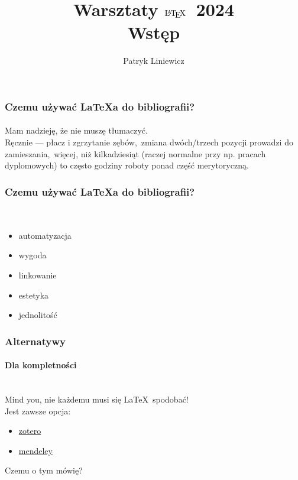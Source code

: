 \documentclass[14pt,compress,usenames,dvipsnames,aspectratio=169]{beamer}
\title{Warsztaty $\textrm{\LaTeX}$\ 2024 \\ {\normalsize Wstęp}}
\author{Patryk Liniewicz}
\institute[]{%
{\Large $\mel{N}{\hat{K}}{F}$}
}
\date{}
\begin{document}

\begin{frame}[plain]
\titlepage
\end{frame}

\begin{frame}[c]
	\frametitle{Czemu używać {\LaTeX}a do bibliografii?}
	\framesubtitle{}
	Mam nadzieję, że nie muszę tłumaczyć.\pause\\

	Ręcznie --- płacz i zgrzytanie zębów,\pause~zmiana dwóch/trzech pozycji prowadzi do zamieszania,\pause~więcej, niż kilkadziesiąt (raczej normalne przy np. pracach dyplomowych) to często godziny roboty ponad część merytoryczną.

\end{frame}

\begin{frame}[fragile,c]
	\frametitle{Czemu używać {\LaTeX}a do bibliografii?}
	\framesubtitle{}\pause\\
	\begin{itemize}
		\item automatyzacja\pause\\
		\item wygoda\pause\\
		\item linkowanie\pause\\
		\item estetyka\pause\\
		\item jednolitość
	\end{itemize}
\end{frame}

\begin{frame}[c]
	\frametitle{Alternatywy}
	\framesubtitle{Dla kompletności}\pause\\

	Mind you, nie każdemu musi się \LaTeX~spodobać!\pause\\

	Jest zawsze opcja: \pause\\
	\begin{itemize}
		\item \href{https://www.zotero.org/}{zotero} \pause\\
		\item \href{https://blog.mendeley.com/}{mendeley}  \pause\\
	\end{itemize}
    
	Czemu o tym mówię?
    
\end{frame}
\end{document}
